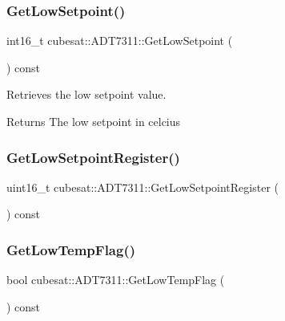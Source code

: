 \subsubsection{\texorpdfstring{Get\+Low\+Setpoint()}{GetLowSetpoint()}}
{\footnotesize\ttfamily int16\+\_\+t cubesat\+::\+A\+D\+T7311\+::\+Get\+Low\+Setpoint (\begin{DoxyParamCaption}{ }\end{DoxyParamCaption}) const\hspace{0.3cm}{\ttfamily [inline]}}



Retrieves the low setpoint value. 

\begin{DoxyReturn}{Returns}
The low setpoint in celcius 
\end{DoxyReturn}
\mbox{\label{classcubesat_1_1ADT7311_a1cc3625e29758f775de262aaea89b0f1}} 
\subsubsection{\texorpdfstring{Get\+Low\+Setpoint\+Register()}{GetLowSetpointRegister()}}
{\footnotesize\ttfamily uint16\+\_\+t cubesat\+::\+A\+D\+T7311\+::\+Get\+Low\+Setpoint\+Register (\begin{DoxyParamCaption}{ }\end{DoxyParamCaption}) const\hspace{0.3cm}{\ttfamily [inline]}}

\mbox{\label{classcubesat_1_1ADT7311_aa72c15f502541eb8fbfff33b77a27423}} 
\subsubsection{\texorpdfstring{Get\+Low\+Temp\+Flag()}{GetLowTempFlag()}}
{\footnotesize\ttfamily bool cubesat\+::\+A\+D\+T7311\+::\+Get\+Low\+Temp\+Flag (\begin{DoxyParamCaption}{ }\end{DoxyParamCaption}) const\hspace{0.3cm}{\ttfamily [inline]}}



